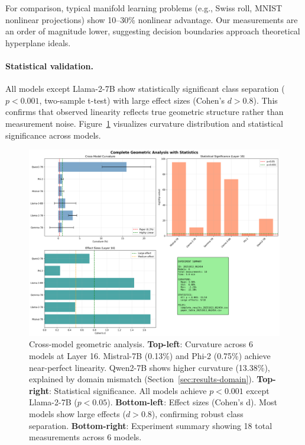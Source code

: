 \documentclass[11pt]{article}
\begin{document}
For comparison, typical manifold learning problems (e.g., Swiss roll, MNIST nonlinear projections) show 10--30\% nonlinear advantage. Our measurements are an order of magnitude lower, suggesting decision boundaries approach theoretical hyperplane ideals.

\paragraph{Statistical validation.} All models except Llama-2-7B show statistically significant class separation ($p < 0.001$, two-sample t-test) with large effect sizes (Cohen's $d > 0.8$). This confirms that observed linearity reflects true geometric structure rather than measurement noise. Figure~\ref{fig:cross-model} visualizes curvature distribution and statistical significance across models.

\begin{figure}[t]
\centering
\includegraphics[width=\textwidth]{figures/complete_geometric_analysis.png}
\caption{Cross-model geometric analysis. \textbf{Top-left}: Curvature across 6 models at Layer 16. Mistral-7B (0.13\%) and Phi-2 (0.75\%) achieve near-perfect linearity. Qwen2-7B shows higher curvature (13.38\%), explained by domain mismatch (Section~\ref{sec:results-domain}). \textbf{Top-right}: Statistical significance. All models achieve $p < 0.001$ except Llama-2-7B ($p < 0.05$). \textbf{Bottom-left}: Effect sizes (Cohen's d). Most models show large effects ($d > 0.8$), confirming robust class separation. \textbf{Bottom-right}: Experiment summary showing 18 total measurements across 6 models.}
\label{fig:cross-model}
\end{figure}
\end{document}
